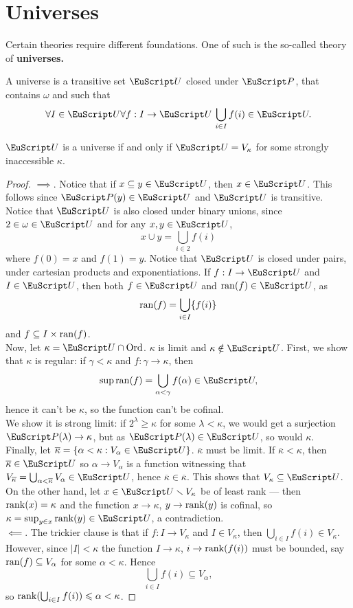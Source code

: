 \documentclass[twoside,openright,titlepage,numbers=noenddot,%
               headinclude,footinclude,cleardoublepage=empty,abstract=on,
               BCOR=23mm,paper=letter,fontsize=11pt
               ]{scrreprt}
\begin{document}
\section{Universes}
Certain theories require different foundations. One of such is the so-called theory of \textbf{universes.}
\begin{definition}
    A universe is a transitive set $\U$ closed under $\P$, that contains $\omega$ and such that
    \[ \forall I \in \U \forall f: I \to \U \, \bigcup_{i \in I} f(i) \in \U. \]
\end{definition}
\begin{theorem}
    $\U$ is a universe if and only if $\U = V_\kappa$ for some strongly inaccessible $\kappa$.
\end{theorem}
\begin{proof}
    $\implies$. Notice that if $x \subseteq y \in \U$, then $x \in \U$. This follows since $\P(y) \in \U$ and $\U$ is transitive. Notice that $\U$ is also closed under binary unions, since $2 \in \omega \in \U$ and for any $x, y \in \U$,
    \[ x \cup y = \bigcup_{i \in 2} f(i) \]
    where $f(0) = x$ and $f(1) = y$. Notice that $\U$ is closed under pairs, under cartesian products and exponentiations. If $f: I \to \U$ and $I \in \U$, then both $f \in \U$ and $\ran(f) \in \U$, as
    \[ \mathrm{ran}(f) = \bigcup_{i \in I} \{f(i)\} \]
    and $f \subseteq I \times \mathrm{ran}(f)$. \\
    Now, let $\kappa = \U \cap \Ord$. $\kappa$ is limit and $\kappa \notin \U$. First, we show that $\kappa$ is regular: if $\gamma < \kappa$ and $f: \gamma \to \kappa$, then
    \[ \sup \ran(f) = \bigcup_{\alpha < \gamma} f(\alpha) \in \U, \]
    hence it can't be $\kappa$, so the function can't be cofinal. \\
    We show it is strong limit: if $2^\lambda \geq \kappa$ for some $\lambda < \kappa$, we would get a surjection $\P(\lambda) \to \kappa$, but as $\P(\lambda) \in \U$, so would $\kappa$. \\
    Finally, let $\overline{\kappa} = \{\alpha < \kappa: V_\alpha \in \U\}$. $\overline{\kappa}$ must be limit. If $\overline{\kappa} < \kappa$, then $\overline{\kappa} \in \U$ so $\alpha \to V_\alpha$ is a function witnessing that $V_{\overline{\kappa}} = \bigcup_{\alpha < \overline{\kappa}} V_\alpha \in \U$, hence $\overline{\kappa} \in \overline{\kappa}$. This shows that $V_\kappa \subseteq \U$. \\
    On the other hand, let $x \in \U \sm V_\kappa$ be of least rank --- then $\mathrm{rank}(x) = \kappa$ and the function $x \to \kappa$, $y \to \mathrm{rank}(y)$ is cofinal, so $\kappa = \sup_{y \in x} \rank(y) \in \U$, a contradiction. \\
    $\impliedby$. The trickier clause is that if $f: I \to V_\kappa$ and $I \in V_\kappa$, then $\bigcup_{i \in I} f(i) \in V_\kappa$. However, since $\vert I \vert < \kappa$ the function $I \to \kappa$, $i \to \mathrm{rank}(f(i))$ must be bounded, say $\mathrm{ran}(f) \subseteq V_\alpha$ for some $\alpha < \kappa$. Hence
    \[ \bigcup_{i \in I} f(i) \subseteq V_\alpha, \]
    so $\mathrm{rank}(\bigcup_{i \in I} f(i)) \leqslant \alpha < \kappa$.
\end{proof}
\end{document}
